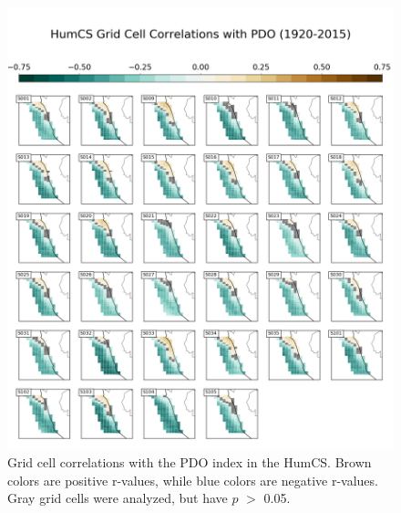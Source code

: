 \documentclass[12pt]{article}
\begin{document}
\begin{figure}[!h]
	\centering
	\includegraphics[width=\linewidth]{../../figs/humcs/spatial-correlations/humcs-grid-cell-correlations-pdo-postage.png}
	\caption{Grid cell correlations with the PDO index in the HumCS. Brown colors are positive r-values, while blue colors are negative r-values. Gray grid cells were analyzed, but have $p$ $>$ 0.05.}
	\label{fig:HumCS-PDO-Spatial}
\end{figure}
\newpage
\end{document}
